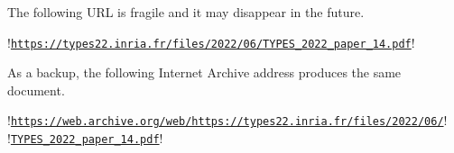 \begin{example}

The following URL is fragile and it may disappear in the future.\mbox{}

\noindent\begin{minipage}{\textwidth}
\begin{browserlisting}
!\texttt{\url{https://types22.inria.fr/files/2022/06/TYPES_2022_paper_14.pdf}}!
\end{browserlisting}
\end{minipage}

As a backup, the following Internet Archive address produces the same
document.\mbox{}

\noindent\begin{minipage}{\textwidth}
\begin{browserlisting}
!\texttt{\href{https://web.archive.org/web/https://types22.inria.fr/files/2022/06/}{https://web.archive.org/web/https://types22.inria.fr/files/2022/06/}}!
!\hspace{2em}\texttt{\href{https://web.archive.org/web/https://types22.inria.fr/files/2022/06/TYPES_2022_paper_14.pdf}{TYPES\_2022\_paper\_14.pdf}}!
\end{browserlisting}
\end{minipage}
\end{example}
